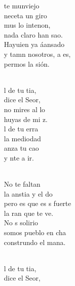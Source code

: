 \documentclass[12pt]{article}
\begin{document}
\begin{multicols*}{2}
\begin{cancion}%
	te munviejo\\
	neceta un giro \\
	mus lo intenon,\\
	nada claro han sao.\\
	Hayuien ya áansado\\
	y tamn nosotros, a es, \\
	permos la sión.\\\jump\\
	\begin{chorus}%
	l de tu tia,\\
	 dice el Seor,\\
	no mires al lo\\
	 huyas de mi z.\\
	l de tu erra\\
	la mediodad\\
	anza tu cao\\
	y nte a ir.\\
	\end{chorus}%
	\jump\\
	No te faltan\\
	la anstia y el do\\
	pero es que es s fuerte\\
	la ran que te ve.\\
	No s solirio\\
	somos pueblo en cha\\
	construndo el mana.\\\jump\\
	\begin{chorus}%
	l de tu tia,\\
	 dice el Seor,\\

\end{chorus}
\end{cancion}
\end{multicols*}
\end{document}
